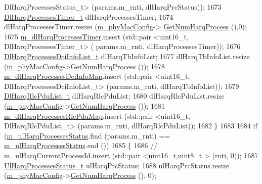 \begin{DoxyCode}
       DlHarqProcessesStatus\_t> (params.m\_rnti, dlHarqPrcStatus));
1673         \hyperlink{classns3_1_1MmWaveFlexTtiPfMacScheduler_a4f1abd9cba2b6680b64512f202305afb}{DlHarqProcessesTimer\_t} dlHarqProcessesTimer;
1674         dlHarqProcessesTimer.resize (\hyperlink{classns3_1_1MmWaveMacScheduler_a24d7af4971d2e500fe543cefbafa2fd9}{m\_phyMacConfig}->
      \hyperlink{classns3_1_1MmWavePhyMacCommon_a40773d84172ebeb5aff125f56ebcc5ac}{GetNumHarqProcess} (),0);
1675         \hyperlink{classns3_1_1MmWaveFlexTtiPfMacScheduler_a833b2d085a67e2fcb7403ebe1f4c6f86}{m\_dlHarqProcessesTimer}.insert (std::pair <uint16\_t, DlHarqProcessesTimer\_t> (
      params.m\_rnti, dlHarqProcessesTimer));
1676         \hyperlink{classns3_1_1MmWaveFlexTtiPfMacScheduler_ac9919290b2875ec0f1b50e9443c26d49}{DlHarqProcessesDciInfoList\_t} dlHarqTbInfoList;
1677         dlHarqTbInfoList.resize (\hyperlink{classns3_1_1MmWaveMacScheduler_a24d7af4971d2e500fe543cefbafa2fd9}{m\_phyMacConfig}->\hyperlink{classns3_1_1MmWavePhyMacCommon_a40773d84172ebeb5aff125f56ebcc5ac}{GetNumHarqProcess} ());
1678         \hyperlink{classns3_1_1MmWaveFlexTtiPfMacScheduler_a409de362c5e49fc6956b26ee2644db4d}{m\_dlHarqProcessesDciInfoMap}.insert (std::pair <uint16\_t,
       DlHarqProcessesDciInfoList\_t> (params.m\_rnti, dlHarqTbInfoList));
1679         \hyperlink{classns3_1_1MmWaveFlexTtiPfMacScheduler_a09920c18040ab1c56ec463c790103858}{DlHarqRlcPduList\_t} dlHarqRlcPduList;
1680         dlHarqRlcPduList.resize (\hyperlink{classns3_1_1MmWaveMacScheduler_a24d7af4971d2e500fe543cefbafa2fd9}{m\_phyMacConfig}->\hyperlink{classns3_1_1MmWavePhyMacCommon_a40773d84172ebeb5aff125f56ebcc5ac}{GetNumHarqProcess} ());
1681         \hyperlink{classns3_1_1MmWaveFlexTtiPfMacScheduler_a9a0027a79dee0a60f04e55c25efb7ab7}{m\_dlHarqProcessesRlcPduMap}.insert (std::pair <uint16\_t,
       DlHarqRlcPduList\_t> (params.m\_rnti, dlHarqRlcPduList));
1682   \}
1683 
1684   \textcolor{keywordflow}{if} (\hyperlink{classns3_1_1MmWaveFlexTtiPfMacScheduler_aee0051900f7d928d25d577ad83983bf4}{m\_ulHarqProcessesStatus}.find (params.m\_rnti) == 
      \hyperlink{classns3_1_1MmWaveFlexTtiPfMacScheduler_aee0051900f7d928d25d577ad83983bf4}{m\_ulHarqProcessesStatus}.end ())
1685   \{
1686         \textcolor{comment}{//                              m\_ulHarqCurrentProcessId.insert (std::pair <uint16\_t,uint8\_t >
       (rnti, 0));}
1687         \hyperlink{classns3_1_1MmWaveFlexTtiPfMacScheduler_aad5df5fc3e0a4493cfe1a7ee492bfa80}{UlHarqProcessesStatus\_t} ulHarqPrcStatus;
1688         ulHarqPrcStatus.resize (\hyperlink{classns3_1_1MmWaveMacScheduler_a24d7af4971d2e500fe543cefbafa2fd9}{m\_phyMacConfig}->\hyperlink{classns3_1_1MmWavePhyMacCommon_a40773d84172ebeb5aff125f56ebcc5ac}{GetNumHarqProcess} (), 0);

\end{DoxyCode}
